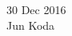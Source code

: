 \documentclass[a4paper,11pt]{article}
\begin{document}
30 Dec 2016\\
Jun Koda

\label{LastPage}
\end{document}
